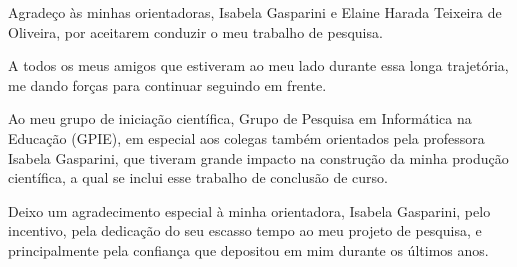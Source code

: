 \begin{agradecimentos}
Agradeço às minhas orientadoras, Isabela Gasparini e Elaine Harada Teixeira de Oliveira, por aceitarem conduzir o meu trabalho de pesquisa.

A todos os meus amigos que estiveram ao meu lado durante essa longa trajetória, me dando forças para continuar seguindo em frente.

Ao meu grupo de iniciação científica, Grupo de Pesquisa em Informática na Educação (GPIE), em especial aos colegas também orientados pela professora Isabela Gasparini, que tiveram grande impacto na construção da minha produção científica, a qual se inclui esse trabalho de conclusão de curso. %

Deixo um agradecimento especial à minha orientadora, Isabela Gasparini, pelo incentivo, pela dedicação do seu escasso tempo ao meu projeto de pesquisa, e principalmente pela confiança que depositou em mim durante os últimos anos.


\end{agradecimentos}
